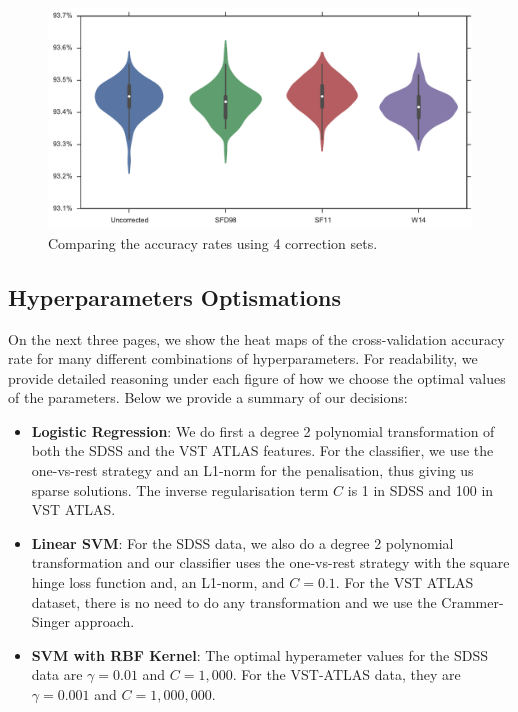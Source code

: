 \begin{figure}[tbp]
	\centering
	\includegraphics[width=\textwidth]{figures/4_expt1/violin_reddening_correction}
	\caption[Accuracy rates with four reddening correction sets]{Comparing the
		accuracy rates using 4 correction sets.}
	\label{fig:reddeningviolin}
\end{figure}

\subsection{Hyperparameters Optismations}
On the next three pages, we show the heat maps of the cross-validation accuracy rate
for many different combinations of hyperparameters. For readability, we provide detailed
reasoning under each figure of how we choose the optimal values of the parameters.
Below we provide a summary of our decisions:
\begin{itemize}
	\item \textbf{Logistic Regression}: We do first a degree 2 polynomial transformation of both
	the SDSS and the VST ATLAS features. For the classifier, we use the one-vs-rest
	strategy and an L1-norm for the penalisation, thus giving us sparse solutions. The inverse
	regularisation term $C$ is 1 in SDSS and 100 in VST ATLAS.
	\item \textbf{Linear SVM}: For the SDSS data, we also do a degree 2 polynomial transformation
	and our classifier uses the one-vs-rest strategy with the square hinge loss function
	and, an L1-norm, and $C=0.1$. For the VST ATLAS dataset, there is no need to do 
	any transformation and we use the Crammer-Singer approach.
	\item \textbf{SVM with RBF Kernel}: The optimal hyperameter values for the SDSS data are
	$\gamma = 0.01$ and $C = 1,000$. For the VST-ATLAS data, they are $\gamma = 0.001$ and
	$C = 1,000,000$.
\end{itemize}

